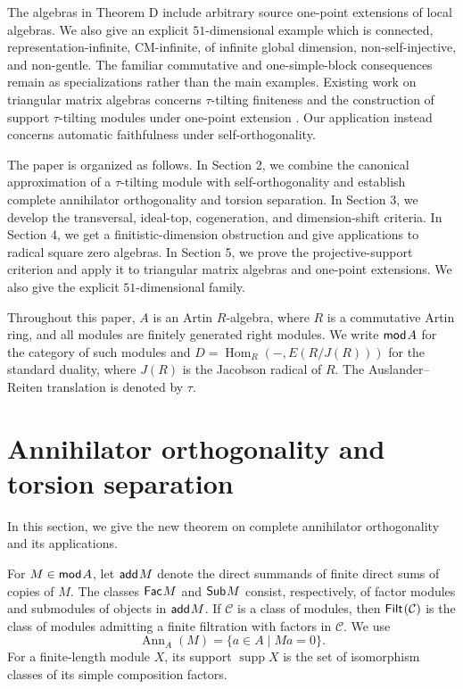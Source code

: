 \documentclass[a4paper,reqno]{amsart}
\theoremstyle{definition}
\newcommand{\Hom}{\operatorname{Hom}\nolimits}
\newcommand{\Ann}{\operatorname{Ann}\nolimits}
\newcommand{\supp}{\operatorname{supp}\nolimits}
\newcommand{\add}{\mathsf{add}\hspace{.01in}}
\newcommand{\Fac}{\mathsf{Fac}\hspace{.01in}}
\newcommand{\Filt}{\mathsf{Filt}\hspace{.01in}}
\newcommand{\Sub}{\mathsf{Sub}\hspace{.01in}}
\newcommand{\modA}{\mathsf{mod}\hspace{.01in}A}
\numberwithin{equation}{section}
\begin{document}
The algebras in Theorem D include arbitrary source one-point extensions of local algebras. We also give an explicit
$51$-dimensional example which is connected, representation-infinite,
CM-infinite, of infinite global dimension, non-self-injective, and
non-gentle. The familiar commutative and one-simple-block
consequences remain as specializations rather than the main examples.
Existing work on triangular matrix algebras concerns $\tau$-tilting finiteness and the construction of support
$\tau$-tilting modules under one-point extension
\cite{AiharaHonma,GaoXie,Suarez}. Our application instead concerns
automatic faithfulness under self-orthogonality.

The paper is organized as follows. In Section 2, we combine the
canonical approximation of a $\tau$-tilting module with
self-orthogonality and establish complete annihilator orthogonality
and torsion separation. In Section 3, we develop the transversal,
ideal-top, cogeneration, and dimension-shift criteria. In Section 4, we get a
finitistic-dimension obstruction and give applications to radical square zero algebras. In Section 5,
we prove the projective-support criterion and apply it to triangular
matrix algebras and one-point extensions. We also give the explicit
$51$-dimensional family.

Throughout this paper, $A$ is an Artin $R$-algebra, where $R$ is a
commutative Artin ring, and all modules are finitely generated right
modules. We write $\modA$ for the category of such modules and
$D=\Hom_R(-,E(R/J(R)))$ for the standard duality, where $J(R)$ is the
Jacobson radical of $R$. The Auslander--Reiten translation is denoted
by $\tau$.

\section{Annihilator orthogonality and torsion separation}

In this section, we give the new theorem on complete annihilator orthogonality and its applications.

For $M\in\modA$, let $\add M$ denote the direct summands of finite direct
sums of copies of $M$. The classes $\Fac M$ and $\Sub M$ consist,
respectively, of factor modules and submodules of objects in $\add M$.
If $\mathcal C$ is a class of modules, then $\Filt(\mathcal C)$ is
the class of modules admitting a finite filtration with factors in
$\mathcal C$.  We use
\[
           \Ann_A(M)=\{a\in A\mid Ma=0\}.
\]
For a finite-length module $X$, its support $\supp X$ is the set of
isomorphism classes of its simple composition factors.
\end{document}
